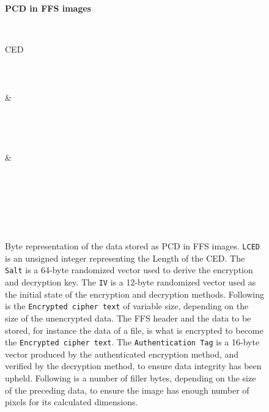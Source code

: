 \begin{figure}[!htb]
	\label{fig:app_bin_pixels}
	\centering
    \textbf{\acrlong{PCD} in \gls{FFS} images}\par\medskip

	\begin{bytefield}[bitwidth=0.0312\textwidth]{32}
		 \\
		\begin{rightwordgroup}{CED}\\
			 \\
			 \\
			 \\
			 & \\
			 \\
			 \\
			\skippedwords \\
			 \\
			 & 
		\end{rightwordgroup} \\
		 \\
		 \\
		\skippedwords \\
		 \\
	\end{bytefield}
	\caption[Byte representation of the data stored as \gls{PCD} in \gls{FFS} images]{Byte representation of the data stored as \gls{PCD} in \gls{FFS} images. \texttt{LCED} is an unsigned integer representing the Length of the \gls{CED}. The \texttt{Salt} is a \mbox{64-byte} randomized vector used to derive the encryption and decryption key. The \texttt{IV} is a \mbox{12-byte} randomized vector used as the initial state of the encryption and decryption methods. Following is the \texttt{Encrypted cipher text} of variable size, depending on the size of the unencrypted data. The \gls{FFS} header and the data to be stored, for instance the data of a file, is what is encrypted to become the \texttt{Encrypted cipher text}. The \texttt{Authentication Tag} is a \mbox{16-byte} vector produced by the authenticated encryption method, and verified by the decryption method, to ensure data integrity has been upheld. Following is a number of filler bytes, depending on the size of the preceding data, to ensure the image has enough number of pixels for its calculated dimensions.}
\end{figure}